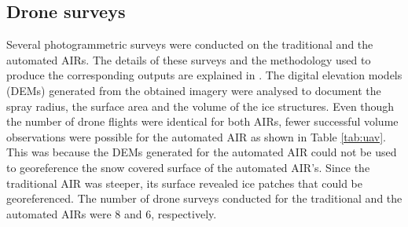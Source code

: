 \documentclass[tc, manuscript]{copernicus}
\begin{document}
\subsection{Drone surveys}

Several photogrammetric surveys were conducted on the traditional and the automated AIRs. The details of these
surveys and the methodology used to produce the corresponding outputs are explained in
\cite{balasubramanianInfluenceMeteorologicalConditions2022}. The digital elevation models (DEMs) generated from
the obtained imagery were analysed to document the spray radius, the surface area and the volume of the ice
structures. Even though the number of drone flights were identical for both AIRs, fewer successful volume
observations were possible for the automated AIR as shown in Table \ref{tab:uav}. This was because the DEMs
generated for the automated AIR could not be used to georeference the snow covered surface of the automated
AIR's. Since the traditional AIR was steeper, its surface revealed ice patches that could be georeferenced. The
number of drone surveys conducted for the traditional and the automated AIRs were 8 and 6, respectively. 
\end{document}
